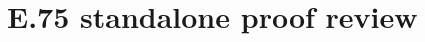 \documentclass[11pt,a4paper]{article}
\begin{document}
\section*{E.75 standalone proof review}



\end{document}
